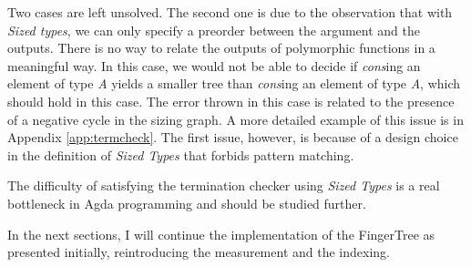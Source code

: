 \documentclass[12pt,twoside,notitlepage]{report}
\begin{document}
\begin{code}
\\
\>[0]\<[2]%
\>[2] \AgdaSymbol{:}  \AgdaSymbol{\{} \AgdaSymbol{:} \AgdaSymbol{\}} \AgdaSymbol{\{}\AgdaSymbol{\}} \AgdaSymbol{\{} \AgdaSymbol{:}  \AgdaSymbol{\}}    \AgdaSymbol{\{}\AgdaSymbol{\}}   \AgdaSymbol{\{}\AgdaSymbol{\}}  \AgdaSymbol{\{}\AgdaSymbol{\}}\<%
\\
\>[0]\<[2]%
\>[2]  \AgdaSymbol{=} \<%
\\
\>[0]\<[2]%
\>[2] \AgdaSymbol{(} \AgdaSymbol{)} \AgdaSymbol{=}   \AgdaSymbol{\{!  !\}} \<%
\\
\>[0]\<[2]%
\>[2] \AgdaSymbol{(}   \AgdaSymbol{)} \AgdaSymbol{=} \AgdaSymbol{\{!   !\}} \<%
\\
\end{code} 

Two cases are left unsolved. The second one is due to the observation that with \textit{Sized types}, we can only specify a preorder between the argument and the outputs. There is no way to relate the outputs of polymorphic functions in a meaningful way. In this case, we would not be able to decide if \textit{cons}ing an element of type \textit{A} yields a smaller tree than \textit{cons}ing an element of type  \textit{A}, which should hold in this case. The error thrown in this case is related to the presence of a negative cycle in the sizing graph. A more detailed example of this issue is in Appendix \ref{app:termcheck}. 
The first issue, however, is because of a design choice in the definition of \textit{Sized Types} that forbids pattern matching\cite{sizedtypes}.

The difficulty of satisfying the termination checker using \textit{Sized Types} is a real bottleneck in Agda programming and should be studied further.

In the next sections, I will continue the implementation of the FingerTree as presented initially, reintroducing the measurement and the indexing.
\end{document}
